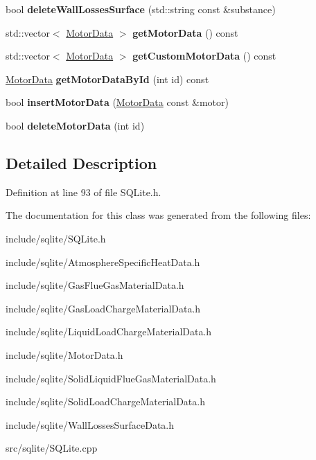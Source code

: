 \begin{DoxyCompactItemize}
\item 
\mbox{\label{class_s_q_lite_aa43f3d56f7caddaef26ad1eccef04118}} 
bool {\bfseries delete\+Wall\+Losses\+Surface} (std\+::string const \&substance)
\item 
\mbox{\label{class_s_q_lite_a5fabd8387b0009f7641bce38ee8e41c5}} 
std\+::vector$<$ \hyperlink{class_motor_data}{Motor\+Data} $>$ {\bfseries get\+Motor\+Data} () const
\item 
\mbox{\label{class_s_q_lite_a0cc4f6952652d05d6a87e2f7cc232d57}} 
std\+::vector$<$ \hyperlink{class_motor_data}{Motor\+Data} $>$ {\bfseries get\+Custom\+Motor\+Data} () const
\item 
\mbox{\label{class_s_q_lite_a4b0a99992e2909216b40dc499c86a028}} 
\hyperlink{class_motor_data}{Motor\+Data} {\bfseries get\+Motor\+Data\+By\+Id} (int id) const
\item 
\mbox{\label{class_s_q_lite_a38eb0f1501e0918c267a9ab3a0953a54}} 
bool {\bfseries insert\+Motor\+Data} (\hyperlink{class_motor_data}{Motor\+Data} const \&motor)
\item 
\mbox{\label{class_s_q_lite_ab1f59cd24e3931970bc39079b0a5e612}} 
bool {\bfseries delete\+Motor\+Data} (int id)
\end{DoxyCompactItemize}


\subsection{Detailed Description}


Definition at line 93 of file S\+Q\+Lite.\+h.



The documentation for this class was generated from the following files\+:\begin{DoxyCompactItemize}
\item 
include/sqlite/S\+Q\+Lite.\+h\item 
include/sqlite/Atmosphere\+Specific\+Heat\+Data.\+h\item 
include/sqlite/Gas\+Flue\+Gas\+Material\+Data.\+h\item 
include/sqlite/Gas\+Load\+Charge\+Material\+Data.\+h\item 
include/sqlite/Liquid\+Load\+Charge\+Material\+Data.\+h\item 
include/sqlite/Motor\+Data.\+h\item 
include/sqlite/Solid\+Liquid\+Flue\+Gas\+Material\+Data.\+h\item 
include/sqlite/Solid\+Load\+Charge\+Material\+Data.\+h\item 
include/sqlite/Wall\+Losses\+Surface\+Data.\+h\item 
src/sqlite/S\+Q\+Lite.\+cpp\end{DoxyCompactItemize}
